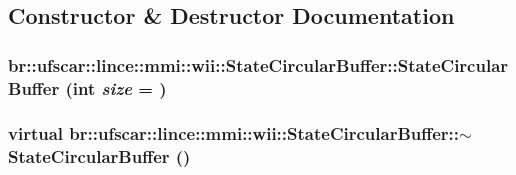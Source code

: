 \subsection{Constructor \& Destructor Documentation}
\hypertarget{classbr_1_1ufscar_1_1lince_1_1mmi_1_1wii_1_1StateCircularBuffer_a33314840ca4d71cf5d391e292ca9bc3e}{
\subsubsection[{StateCircularBuffer}]{\setlength{\rightskip}{0pt plus 5cm}br::ufscar::lince::mmi::wii::StateCircularBuffer::StateCircularBuffer (int {\em size} = {})}}
\label{classbr_1_1ufscar_1_1lince_1_1mmi_1_1wii_1_1StateCircularBuffer_a33314840ca4d71cf5d391e292ca9bc3e}
\hypertarget{classbr_1_1ufscar_1_1lince_1_1mmi_1_1wii_1_1StateCircularBuffer_a9152c8d7c2692a46c07f7e57b5683d72}{
\subsubsection[{$\sim$StateCircularBuffer}]{\setlength{\rightskip}{0pt plus 5cm}virtual br::ufscar::lince::mmi::wii::StateCircularBuffer::$\sim$StateCircularBuffer ()}}
\label{classbr_1_1ufscar_1_1lince_1_1mmi_1_1wii_1_1StateCircularBuffer_a9152c8d7c2692a46c07f7e57b5683d72}


